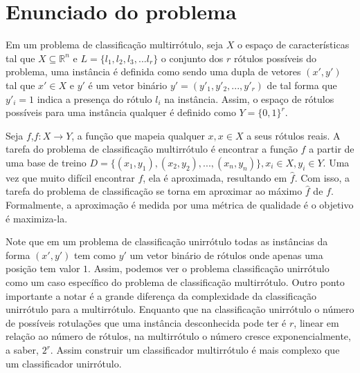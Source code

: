 \section{Enunciado do problema}

Em um problema de classificação multirrótulo, seja $X$ o espaço de características tal que
$X\subseteq \mathbb{R}^n$ e $L=\{l_1,l_2,l_3,...l_r\}$ o conjunto dos $r$ rótulos possíveis do problema,
uma instância é definida como sendo uma dupla de vetores $(x',y')$ tal que $x'\in X$ e $y'$ é um vetor binário
$y'=(y'_1,y'_2,...,y'_r)$ de tal forma que $y'_i=1$ indica a presença do rótulo $l_i$ na instância.
Assim, o espaço de rótulos possíveis para uma instância qualquer é definido como $Y=\{0,1\}^r$.


Seja $f$,$f : X \rightarrow Y$, a função que mapeia qualquer $x,x \in X$ a seus rótulos reais.
A tarefa do problema de classificação multirrótulo é encontrar a função $f$
a partir de uma base de treino $D=\{(x_1,y_1),(x_2,y_2),...,(x_n,y_n)\}, x_i\in X, y_i\in Y$.
Uma vez que muito difícil encontrar $f$, ela é aproximada, resultando em $\hat{f}$.
Com isso, a tarefa do problema de classificação se torna em aproximar ao máximo $\hat{f}$ de $f$.
Formalmente, a aproximação é medida por uma métrica de qualidade é o objetivo é maximiza-la.



Note que em um problema de classificação unirrótulo todas as instâncias da forma $(x',y')$ tem como $y'$
um vetor binário de rótulos onde apenas uma posição tem valor $1$. Assim, podemos ver o problema classificação
unirrótulo como um caso específico do problema de classificação multirrótulo.
Outro ponto importante a notar é a grande diferença da complexidade da classificação unirrótulo para a multirrótulo.
Enquanto que na classificação unirrótulo o número de possíveis rotulações que uma instância desconhecida pode ter é
$r$, linear em relação ao número de rótulos, na multirrótulo o número cresce exponencialmente, a saber, $2^r$.
Assim construir um classificador multirrótulo é mais complexo que um classificador unirrótulo.

